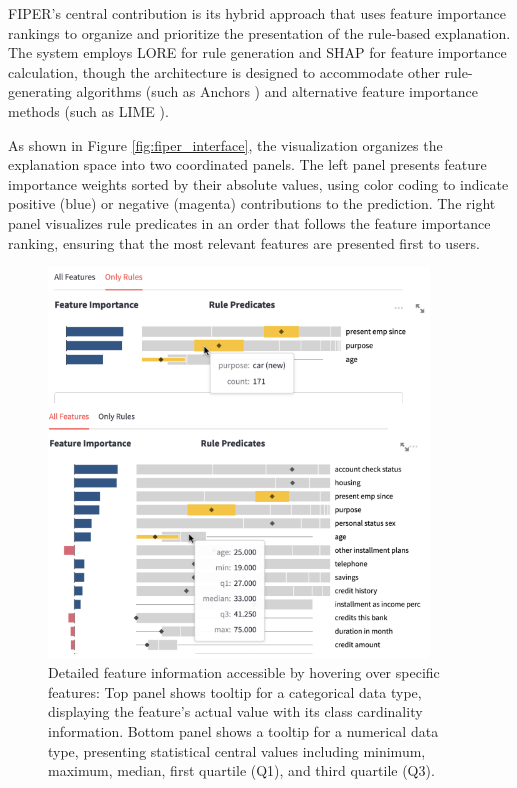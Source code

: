 FIPER's central contribution is its hybrid approach that uses feature importance rankings to organize and prioritize the presentation of the rule-based explanation. The system employs LORE \cite{guidotti2022stable, guidotti2019lore} for rule generation and SHAP \cite{lundberg2017unified} for feature importance calculation, though the architecture is designed to accommodate other rule-generating algorithms (such as Anchors \cite{10.5555/3504035.3504222}) and alternative feature importance methods (such as LIME \cite{ribeiro2016should}).

As shown in Figure \ref{fig:fiper_interface}, the visualization organizes the explanation space into two coordinated panels. The left panel presents feature importance weights sorted by their absolute values, using color coding to indicate positive (blue) or negative (magenta) contributions to the prediction. The right panel visualizes rule predicates in an order that follows the feature importance ranking, ensuring that the most relevant features are presented first to users.

\begin{figure}[ht!]
\centering
\includegraphics[width=0.9\textwidth]{images/FIPER 2.png}
\caption{Detailed feature information accessible by hovering over specific features: Top panel shows tooltip for a categorical data type, displaying the feature's actual value with its class cardinality information. Bottom panel shows a tooltip for a numerical data type, presenting statistical central values including minimum, maximum, median, first quartile (Q1), and third quartile (Q3).}
\label{fig:fiper_details}
\end{figure}

